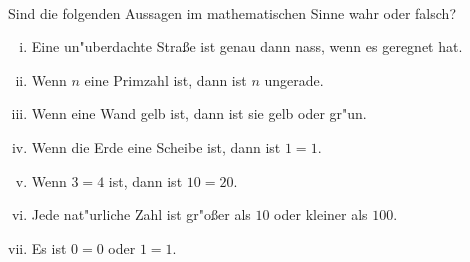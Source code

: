 \newcommand{\printpraesenzlsg}{false}
\newcommand{\printloesungen}{false}
\newcommand{\printbewertungen}{false}
\newcommand{\blattnummer}{1}



\iforiginal{}

	

 \\
Sind die folgenden Aussagen im mathematischen Sinne wahr oder
falsch?

\begin{enumerate}[(i)]
  \item Eine un"uberdachte Stra\ss e ist genau dann nass, wenn es geregnet hat.
  \item Wenn $n$ eine Primzahl ist, dann ist $n$ ungerade.
  \item Wenn eine Wand gelb ist, dann ist sie gelb oder gr"un.
  \item Wenn die Erde eine Scheibe ist, dann ist $1=1$.
  \item Wenn $3=4$ ist, dann ist $10=20$.
  \item Jede nat"urliche Zahl ist gr"o\ss er als $10$ oder kleiner als $100$.
  \item Es ist $0=0$ oder $1=1$.
\end{enumerate}





